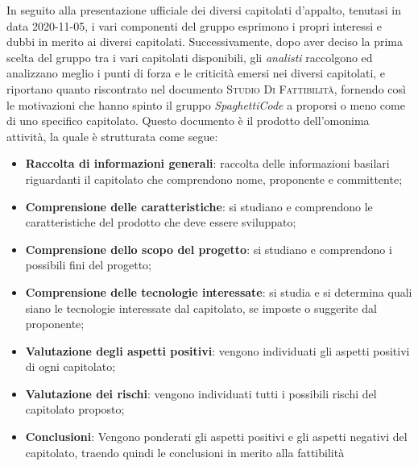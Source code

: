 In seguito alla presentazione ufficiale dei diversi capitolati d'appalto, tenutasi in data 2020-11-05, i vari componenti 
del gruppo esprimono i propri interessi e dubbi in merito ai diversi capitolati.
Successivamente, dopo aver deciso la prima scelta del gruppo tra i vari capitolati disponibili, gli \emph{analisti} 
raccolgono ed analizzano meglio i punti di forza e le criticità emersi nei diversi capitolati, e riportano quanto 
riscontrato nel documento \textsc{Studio Di Fattibilità}, fornendo così le motivazioni che hanno spinto il gruppo 
\emph{SpaghettiCode} a proporsi o meno come  di uno specifico capitolato. Questo documento è il 
prodotto dell'omonima attività, la quale è strutturata come segue: 
\begin{itemize}
    \item \textbf{Raccolta di informazioni generali}: raccolta delle informazioni basilari riguardanti il capitolato 
    che comprendono nome, proponente e committente;
    \item \textbf{Comprensione delle caratteristiche}: si studiano e comprendono le caratteristiche del prodotto che 
    deve essere sviluppato;
    \item \textbf{Comprensione dello scopo del progetto}: si studiano e comprendono i possibili fini del progetto;
    \item \textbf{Comprensione delle tecnologie interessate}: si studia e si determina quali siano le tecnologie 
    interessate dal capitolato, se imposte o suggerite dal proponente;
    \item \textbf{Valutazione degli aspetti positivi}: vengono individuati gli aspetti positivi di ogni capitolato;
    \item \textbf{Valutazione dei rischi}: vengono individuati tutti i possibili rischi del capitolato proposto;  
    \item \textbf{Conclusioni}: Vengono ponderati gli aspetti positivi e gli aspetti negativi del capitolato, traendo 
    quindi le conclusioni in merito alla fattibilità
\end{itemize}

